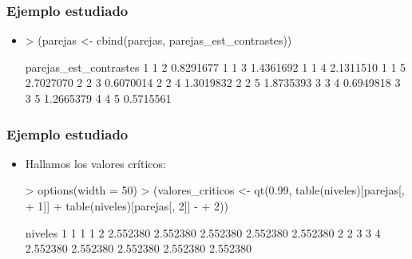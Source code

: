 \begin{frame}[fragile]
\frametitle{Ejemplo estudiado}
\begin{itemize}
\item<2-> 

{
\begin{Schunk}
\begin{Sinput}
> (parejas <- cbind(parejas, parejas_est_contrastes))
\end{Sinput}
\begin{Soutput}
      parejas_est_contrastes
1 1 2              0.8291677
1 1 3              1.4361692
1 1 4              2.1311510
1 1 5              2.7027070
2 2 3              0.6070014
2 2 4              1.3019832
2 2 5              1.8735393
3 3 4              0.6949818
3 3 5              1.2665379
4 4 5              0.5715561
\end{Soutput}
\end{Schunk}
}

\end{itemize}
\end{frame}
\begin{frame}[fragile]
\frametitle{Ejemplo estudiado}
\begin{itemize}
\item<2-> Hallamos los valores críticos:

{\small
\begin{Schunk}
\begin{Sinput}
> options(width = 50)
> (valores_criticos <- qt(0.99, table(niveles)[parejas[, 
+     1]] + table(niveles)[parejas[, 2]] - 
+     2))
\end{Sinput}
\begin{Soutput}
niveles
       1        1        1        1        2 
2.552380 2.552380 2.552380 2.552380 2.552380 
       2        2        3        3        4 
2.552380 2.552380 2.552380 2.552380 2.552380 
\end{Soutput}
\end{Schunk}
}

\end{itemize}
\end{frame}


